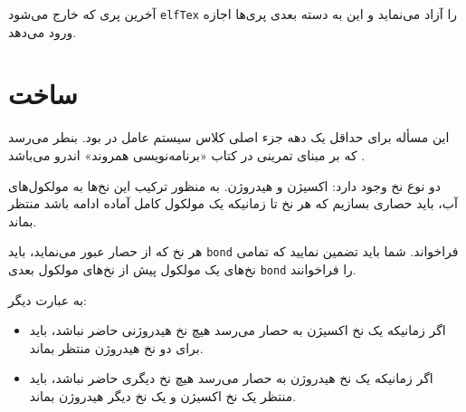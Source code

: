 \documentclass{book}
\begin{document}
    آخرین پری که خارج می‌شود {\tt elfTex} را آزاد می‌نماید و این به دسته‌ بعدی پری‌ها اجازه ورود می‌دهد. 
    

\newpage
\section{ساخت  }
\label{water}

    این مسأله برای حداقل یک دهه جزء اصلی کلاس سیستم عامل در   بود. بنطر می‌رسد که بر مبنای تمرینی 
    در کتاب «برنامه‌نویسی همروند» اندرو می‌باشد \cite{andrews}.

    دو نوع نخ وجود دارد: اکسیژن و هیدروژن. به منظور ترکیب این نخ‌ها به مولکول‌های آب، باید حصاری بسازیم که هر نخ تا زمانیکه یک مولکول کامل 
    آماده ادامه باشد منتظر بماند. 

    هر نخ که از حصار عبور می‌نماید، باید {\tt bond} فراخواند. شما باید تضمین نمایید که تمامی نخ‌های یک مولکول پیش از نخ‌های مولکول بعدی {\tt bond} 
    را فراخوانند. 


    به عبارت دیگر: 

\begin{itemize}

\item
    اگر زمانیکه یک نخ اکسیژن به حصار می‌رسد هیچ نخ‌ هیدروژنی حاضر نباشد، باید برای دو نخ هیدروژن منتظر بماند. 

\item 
    اگر زمانیکه یک نخ هیدروژن به حصار می‌رسد هیچ نخ دیگری حاضر نباشد، باید منتظر یک نخ  اکسیژن و یک نخ دیگر هیدروژن بماند. 
\end{itemize}
\end{document}
